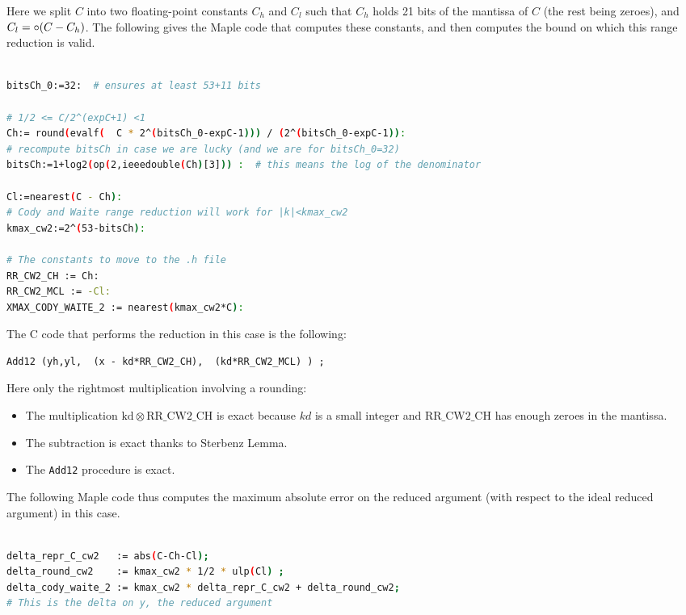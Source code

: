 Here we split $C$ into two floating-point constants $C_h$ and $C_l$
such that $C_h$ holds 21 bits of the mantissa of $C$ (the rest being
zeroes), and $C_l=\circ(C-C_h)$.  The following gives the
Maple code that computes these constants, and then computes the
bound on which this range reduction is valid.

\begin{lstlisting}[caption={Maple script for computing constants for Cody and Waite 2},
  firstnumber=1,  language={sh}, numbers=none]% of course it's maple
%Skip a line here, I don't know why, otherwise latex eats the first line

bitsCh_0:=32:  # ensures at least 53+11 bits

# 1/2 <= C/2^(expC+1) <1
Ch:= round(evalf(  C * 2^(bitsCh_0-expC-1))) / (2^(bitsCh_0-expC-1)):
# recompute bitsCh in case we are lucky (and we are for bitsCh_0=32)
bitsCh:=1+log2(op(2,ieeedouble(Ch)[3])) :  # this means the log of the denominator

Cl:=nearest(C - Ch):
# Cody and Waite range reduction will work for |k|<kmax_cw2
kmax_cw2:=2^(53-bitsCh):

# The constants to move to the .h file
RR_CW2_CH := Ch:
RR_CW2_MCL := -Cl:
XMAX_CODY_WAITE_2 := nearest(kmax_cw2*C):
\end{lstlisting}

The C code that performs the reduction in this case is the following:

\begin{lstlisting}[caption={Cody and Waite range reduction with two
    constants},firstnumber=31]
	Add12 (yh,yl,  (x - kd*RR_CW2_CH),  (kd*RR_CW2_MCL) ) ;
\end{lstlisting}

Here only the rightmost multiplication involving a rounding:
\begin{itemize}
\item The multiplication $\mathrm{kd}\otimes \mathrm{RR\_CW2\_CH}$ is
  exact because $kd$ is a small integer and $\mathrm{RR\_CW2\_CH}$
  has enough zeroes in the mantissa.
\item The subtraction is exact thanks to Sterbenz Lemma.
\item The \texttt{Add12} procedure is exact.
\end{itemize}

The following Maple code thus computes the maximum absolute error on
the reduced argument (with respect to the ideal reduced argument) in
this case.
\begin{lstlisting}[caption={Maple script for computing absolute error for Cody and Waite 2},
  firstnumber=1,  language={sh}, numbers=none]% of course it's maple

delta_repr_C_cw2   := abs(C-Ch-Cl);
delta_round_cw2    := kmax_cw2 * 1/2 * ulp(Cl) ;
delta_cody_waite_2 := kmax_cw2 * delta_repr_C_cw2 + delta_round_cw2;
# This is the delta on y, the reduced argument
\end{lstlisting}


